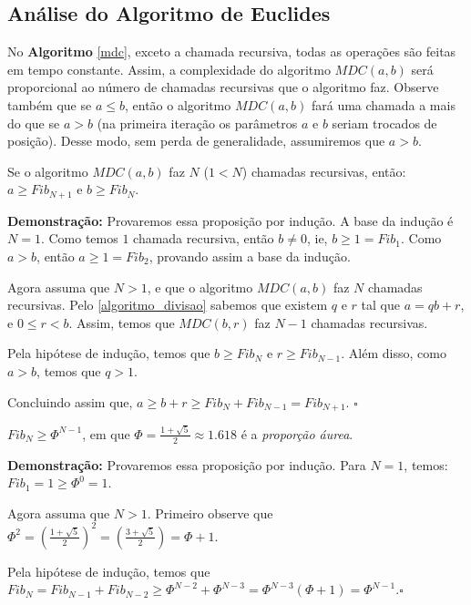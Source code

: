\subsection{Análise do Algoritmo de Euclides}

No \textbf{Algoritmo} \autoref{mdc}, exceto a chamada recursiva, todas as operações são feitas em tempo constante. Assim, 
a complexidade do algoritmo $MDC(a,b)$ será proporcional ao número de chamadas recursivas que o algoritmo faz.
Observe também que se $a\leq b$, então o algoritmo $MDC(a,b)$ fará uma chamada a mais do que se $a>b$ (na primeira iteração
os parâmetros $a$ e $b$ seriam trocados de posição). Desse modo, sem perda de generalidade, assumiremos que $a > b$.

\begin{proposition}\label{algoritmo_euclides_prop1}
Se o algoritmo $MDC(a,b)$ faz $N$ ($1 < N$) chamadas recursivas, então: $a\geq Fib_{N+1}$ e $b \geq Fib_{N}$.
\end{proposition}
\textbf{Demonstração:}
Provaremos essa proposição por indução. A base da indução é $N=1$. Como temos $1$ chamada recursiva, então $b\neq0$, ie, 
$b \geq 1 = Fib_1$. Como $a > b$, então $a \geq 1 = Fib_2$, provando assim a base da indução.  

Agora assuma que $N>1$, e que o algoritmo $MDC(a,b)$ faz $N$ chamadas recursivas. Pelo \autoref{algoritmo_divisao} sabemos que existem
$q$ e $r$ tal que $a=qb+r$, e $0\leq r<b$. 
Assim, temos que $MDC(b,r)$ faz $N-1$ chamadas recursivas.

Pela hipótese de indução, temos que $b\geq Fib_N$ e $r\geq Fib_{N-1}$. Além disso, como $a > b$, temos que $q > 1$. 

Concluindo assim que, $a \geq b+r \geq Fib_N + Fib_{N-1} = Fib_{N+1}$. $\square$

\begin{proposition}\label{algoritmo_euclides_prop2}
$Fib_N \geq \Phi^{N-1}$, em que $\Phi = \frac{1+\sqrt{5}}{2} \approx 1.618$ é a \textit{proporção áurea}.
\end{proposition}
\textbf{Demonstração:}
Provaremos essa proposição por indução. Para $N=1$, temos: $Fib_1 = 1 \geq \Phi^{0} = 1$.

Agora assuma que $N>1$. Primeiro observe que $\Phi^2 = (\frac{1+\sqrt{5}}{2})^2 = (\frac{3+\sqrt{5}}{2}) = \Phi + 1$.

Pela hipótese de indução, temos que $Fib_N = Fib_{N-1} + Fib_{N-2} \geq \Phi^{N-2} + \Phi^{N-3} = \Phi^{N-3}(\Phi+1) = \Phi^{N-1}$.$\square$
\newline

